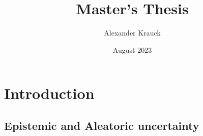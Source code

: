 \documentclass{article}
\title{Master's Thesis}
\author{Alexander Krauck}
\date{August 2023}
\begin{document}
\maketitle

\section{Introduction}

\subsection{Epistemic and Aleatoric uncertainty}
\end{document}
